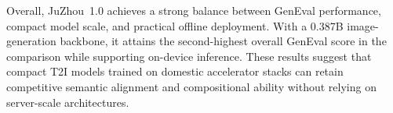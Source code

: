 Overall, JuZhou~1.0 achieves a strong balance between GenEval performance, compact model scale, and practical offline deployment. With a 0.387B image-generation backbone, it attains the second-highest overall GenEval score in the comparison while supporting on-device inference. These results suggest that compact T2I models trained on domestic accelerator stacks can retain competitive semantic alignment and compositional ability without relying on server-scale architectures.

